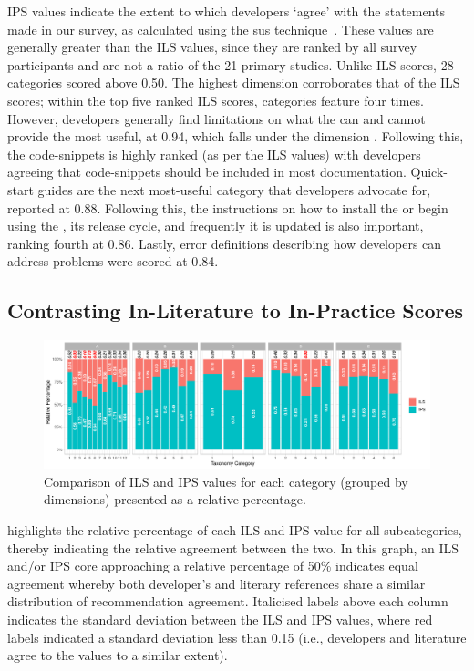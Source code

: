 IPS values indicate the extent to which developers `agree' with the statements made in our survey, as calculated using the \gls{sus} technique~\citep{Brooke:1996ua}. These values are generally greater than the ILS values, since they are ranked by all survey participants and are not a ratio of the 21 primary studies. Unlike ILS scores, 28 categories scored above 0.50. The highest dimension corroborates that of the ILS scores; within the top five ranked ILS scores, \dima{} categories feature four times. However, developers generally find limitations on what the  can and cannot provide the most useful, at 0.94, which falls under the \dimb{} dimension . Following this, the code-snippets  is highly ranked (as per the ILS values) with developers agreeing that code-snippets should be included in most  documentation. Quick-start guides  are the next most-useful category that developers advocate for, reported at 0.88. Following this, the instructions on how to install the  or begin using the , its release cycle, and frequently it is updated  is also important, ranking fourth at 0.86. Lastly, error definitions describing how developers can address problems  were scored at 0.84.


\subsection{Contrasting In-Literature to In-Practice Scores}
\label{tse2020:sec:tax-analysis:ils-vs-ips}

\begin{figure}[t]
  \includegraphics[width=\linewidth]{ils-vs-ips3}
  \caption[Comparison of ILS and IPS values]{Comparison of ILS and IPS values for each category (grouped by dimensions) presented as a relative percentage.}
  \label{tse2020:fig:ils-vs-ips}
\end{figure}

 highlights the relative percentage of each ILS and IPS value for all subcategories, thereby indicating the relative agreement between the two. In this graph, an ILS and/or IPS core approaching a relative percentage of 50\% indicates equal agreement whereby both developer's and literary references share a similar distribution of recommendation agreement. Italicised labels above each column indicates the standard deviation between the ILS and IPS values, where red labels indicated a standard deviation less than 0.15 (i.e., developers and literature agree to the values to a similar extent).


